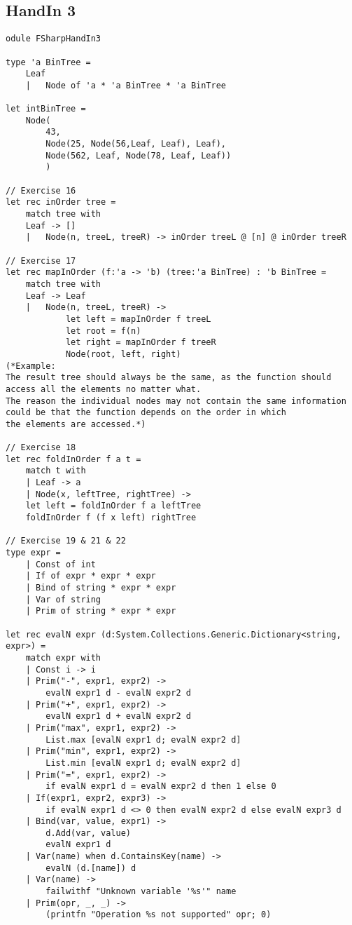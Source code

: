 \subsection{HandIn 3}
\label{Appendix_FSharp_Melnyk_3}
\begin{lstlisting}
odule FSharpHandIn3

type 'a BinTree =
    Leaf
    |   Node of 'a * 'a BinTree * 'a BinTree

let intBinTree = 
    Node(
        43, 
        Node(25, Node(56,Leaf, Leaf), Leaf), 
        Node(562, Leaf, Node(78, Leaf, Leaf))
        )

// Exercise 16
let rec inOrder tree = 
    match tree with
    Leaf -> []
    |   Node(n, treeL, treeR) -> inOrder treeL @ [n] @ inOrder treeR

// Exercise 17
let rec mapInOrder (f:'a -> 'b) (tree:'a BinTree) : 'b BinTree = 
    match tree with
    Leaf -> Leaf
    |   Node(n, treeL, treeR) -> 
            let left = mapInOrder f treeL
            let root = f(n)
            let right = mapInOrder f treeR
            Node(root, left, right)
(*Example: 
The result tree should always be the same, as the function should 
access all the elements no matter what. 
The reason the individual nodes may not contain the same information 
could be that the function depends on the order in which 
the elements are accessed.*)

// Exercise 18
let rec foldInOrder f a t = 
    match t with
    | Leaf -> a
    | Node(x, leftTree, rightTree) ->
    let left = foldInOrder f a leftTree
    foldInOrder f (f x left) rightTree

// Exercise 19 & 21 & 22
type expr =
    | Const of int
    | If of expr * expr * expr
    | Bind of string * expr * expr
    | Var of string
    | Prim of string * expr * expr

let rec evalN expr (d:System.Collections.Generic.Dictionary<string, expr>) =
    match expr with
    | Const i -> i
    | Prim("-", expr1, expr2) -> 
        evalN expr1 d - evalN expr2 d
    | Prim("+", expr1, expr2) -> 
        evalN expr1 d + evalN expr2 d
    | Prim("max", expr1, expr2) -> 
        List.max [evalN expr1 d; evalN expr2 d]
    | Prim("min", expr1, expr2) -> 
        List.min [evalN expr1 d; evalN expr2 d]
    | Prim("=", expr1, expr2) -> 
        if evalN expr1 d = evalN expr2 d then 1 else 0
    | If(expr1, expr2, expr3) -> 
        if evalN expr1 d <> 0 then evalN expr2 d else evalN expr3 d
    | Bind(var, value, expr1) -> 
        d.Add(var, value) 
        evalN expr1 d
    | Var(name) when d.ContainsKey(name) -> 
        evalN (d.[name]) d
    | Var(name) -> 
        failwithf "Unknown variable '%s'" name
    | Prim(opr, _, _) -> 
        (printfn "Operation %s not supported" opr; 0)


\end{lstlisting}
